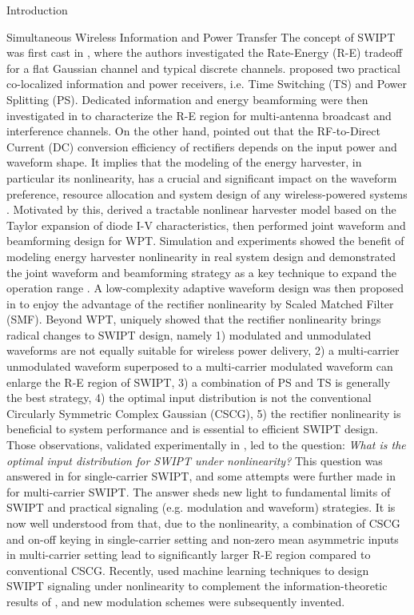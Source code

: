 \documentclass[journal]{IEEEtran}
\begin{document}
\begin{section}{Introduction}
\begin{subsection}{Simultaneous Wireless Information and Power Transfer}
			The concept of SWIPT was first cast in \cite{Varshney2008}, where the authors investigated the Rate-Energy (R-E) tradeoff for a flat Gaussian channel and typical discrete channels. \cite{Zhou2013} proposed two practical co-localized information and power receivers, i.e. Time Switching (TS) and Power Splitting (PS). Dedicated information and energy beamforming were then investigated in \cite{Zhang2013,Park2013} to characterize the R-E region for multi-antenna broadcast and interference channels. On the other hand, \cite{Trotter2009} pointed out that the RF-to-Direct Current (DC) conversion efficiency of rectifiers depends on the input power and waveform shape. It implies that the modeling of the energy harvester, in particular its nonlinearity, has a crucial and significant impact on the waveform preference, resource allocation and system design of any wireless-powered systems \cite{Trotter2009,Clerckx2018,Clerckx2019}. Motivated by this, \cite{Clerckx2016a} derived a tractable nonlinear harvester model based on the Taylor expansion of diode I-V characteristics, then performed joint waveform and beamforming design for WPT. Simulation and experiments showed the benefit of modeling energy harvester nonlinearity in real system design \cite{Kim2019,Kim2020a} and demonstrated the joint waveform and beamforming strategy as a key technique to expand the operation range \cite{Kim2020}. A low-complexity adaptive waveform design was then proposed in \cite{Clerckx2017} to enjoy the advantage of the rectifier nonlinearity by Scaled Matched Filter (SMF). Beyond WPT, \cite{Clerckx2018b} uniquely showed that the rectifier nonlinearity brings radical changes to SWIPT design, namely 1) modulated and unmodulated waveforms are not equally suitable for wireless power delivery, 2) a multi-carrier unmodulated waveform superposed to a multi-carrier modulated waveform can enlarge the R-E region of SWIPT, 3) a combination of PS and TS is generally the best strategy, 4) the optimal input distribution is not the conventional Circularly Symmetric Complex Gaussian (CSCG), 5) the rectifier nonlinearity is beneficial to system performance and is essential to efficient SWIPT design. Those observations, validated experimentally in \cite{Kim2019}, led to the question: \emph{What is the optimal input distribution for SWIPT under nonlinearity?} This question was answered in \cite{Varasteh2020} for single-carrier SWIPT, and some attempts were further made in \cite{Varasteh2019d} for multi-carrier SWIPT. The answer sheds new light to fundamental limits of SWIPT and practical signaling (e.g. modulation and waveform) strategies. It is now well understood from \cite{Clerckx2018b,Varasteh2020,Varasteh2019d} that, due to the nonlinearity, a combination of CSCG and on-off keying in single-carrier setting and non-zero mean asymmetric inputs in multi-carrier setting lead to significantly larger R-E region compared to conventional CSCG. Recently, \cite{Varasteh2020a} used machine learning techniques to design SWIPT signaling under nonlinearity to complement the information-theoretic results of \cite{Varasteh2020}, and new modulation schemes were subsequently invented.

\end{subsection}
\end{section}
\end{document}
